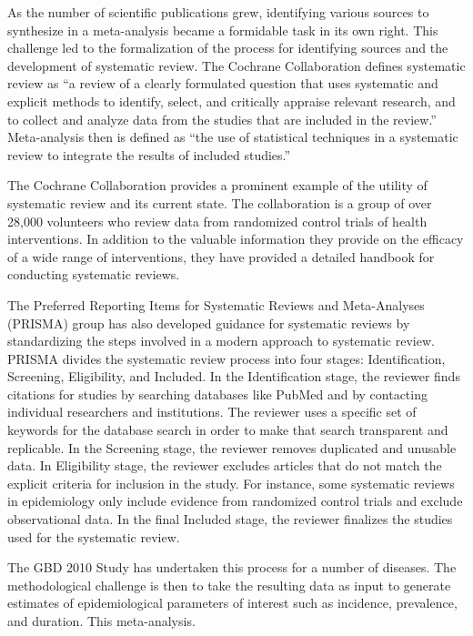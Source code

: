 As the number of scientific publications grew, identifying various
sources to synthesize in a meta-analysis became a formidable task in
its own right. This challenge led to the formalization of the process
for identifying sources and the development of systematic review. The
Cochrane Collaboration defines systematic review as ``a review of a
clearly formulated question that uses systematic and explicit methods
to identify, select, and critically appraise relevant research, and to
collect and analyze data from the studies that are included in the
review.'' Meta-analysis then is defined as ``the use of statistical
techniques in a systematic review to integrate the results of included
studies.'' \cite{Green_Systematic_2005}

The Cochrane Collaboration provides a prominent example of the utility
of systematic review and its current state. The collaboration is a
group of over 28,000 volunteers who review data from randomized
control trials of health interventions.
\cite{Cochrane_Cochrane_2012} In addition to the valuable information
they provide on the efficacy of a wide range of interventions, they
have provided a detailed handbook for conducting systematic
reviews.

The Preferred Reporting Items for Systematic Reviews and Meta-Analyses
(PRISMA) group has also developed guidance for systematic reviews by
standardizing the steps involved in a modern approach to systematic
review. \cite{Liberati_PRISMA_2009} PRISMA divides the systematic
review process into four stages: Identification, Screening,
Eligibility, and Included.  In the Identification stage, the reviewer
finds citations for studies by searching databases like PubMed and by
contacting individual researchers and institutions. The reviewer uses
a specific set of keywords for the database search in order to make
that search transparent and replicable. In the Screening stage, the
reviewer removes duplicated and unusable data. In Eligibility stage,
the reviewer excludes articles that do not match the explicit criteria
for inclusion in the study. For instance, some systematic reviews in
epidemiology only include evidence from randomized control trials and
exclude observational data. In the final Included stage, the reviewer
finalizes the studies used for the systematic review.

The GBD 2010 Study has undertaken this process for a
number of diseases. The methodological challenge is then to take the
resulting data as input to generate estimates of epidemiological
parameters of interest such as incidence, prevalence, and duration.
This meta-analysis.

